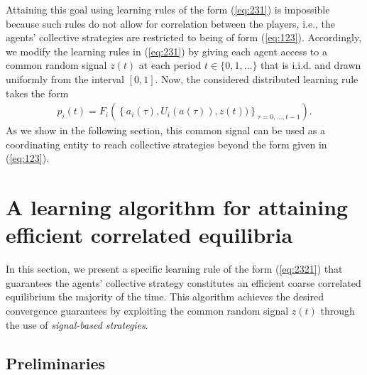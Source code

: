 Attaining this goal using learning rules of the form (\ref{eq:231}) is impossible because such rules do not allow for correlation between the players, i.e., the agents' collective strategies are restricted to being of form (\ref{eq:123}).  Accordingly, we modify the learning rules in (\ref{eq:231}) by giving each agent access to a common random signal $z(t)$ at each period $t \in \{0,1, \dots\}$ that is i.i.d. and drawn uniformly from the interval $[0,1]$.  Now,  the considered distributed learning rule takes the form
%
\begin{eqnarray}\label{eq:2321}
p_i(t) = F_i\left(\left\{a_i(\tau), U_i(a(\tau)), z(t))\right\}_{\tau = 0, \dots, t-1} \right).
\end{eqnarray}
% 
As we show in the following section, this common signal can be used as a coordinating entity to reach collective strategies beyond the form given in (\ref{eq:123}).  


\section{A learning algorithm for attaining efficient correlated equilibria}\label{s:learning algorithm}

In this section, we present a specific learning rule of the form (\ref{eq:2321}) that guarantees the agents' collective strategy constitutes an efficient coarse correlated equilibrium the majority of the time.  This algorithm achieves the desired convergence guarantees by exploiting the common random signal $z(t)$ through the use of \emph{signal-based strategies}.  

\subsection{Preliminaries}

